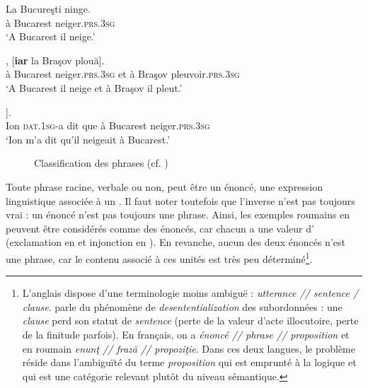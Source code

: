 \ea
\ea
\gll   La  Bucureşti  ninge. \label{ch1:ex21a}\\
à  Bucarest  neiger.\textsc{prs.3sg}\\
\glt ‘A Bucarest il neige.’ 

\ex
{},  [\textbf{iar}  la  Braşov  plouă]. \label{ch1:ex21b}\\
    à  Bucarest  neiger\textsc{.prs.3sg} et  à  Braşov  pleuvoir.\textsc{prs.3sg}\\
\glt ‘A Bucarest il neige et à Braşov il pleut.’ 

\ex
\gll  [Ion  mi-a  spus  [\textbf{că}  la  Bucureşti  ninge]]. \label{ch1:ex21c}\\
    Ion  \textsc{dat.1sg}{}-a  dit  que  à  Bucarest  neiger\textsc{.prs.3sg}\\
\glt ‘Ion m’a dit qu’il neigeait à Bucarest.’ 
\z
\z


\begin{figure} 

\caption{Classification des phrases (cf. \citealt{AbeilleToAppear})}
\label{ch1:fig1}
\end{figure}
   
Toute phrase racine, verbale ou non, peut être un énoncé, {\cad} une expression linguistique associée à un . Il faut noter toutefois que l’inverse n’est pas toujours vrai : un énoncé n’est pas toujours une phrase. Ainsi, les exemples roumains en  peuvent être considérés comme des énoncés, car chacun a une valeur d’ (exclamation en  et injonction en ). En revanche, aucun des deux énoncés n’est une phrase, car le contenu associé à ces unités est très peu déterminé\footnote{L’anglais dispose d’une terminologie moins ambiguë : \textit{utterance // sentence / clause}. \citet{Huddleston1994} parle du phénomène de \textit{desententialization} des subordonnées : une \textit{clause} perd son statut de \textit{sentence} (perte de la valeur d’acte illocutoire, perte de la finitude parfois). En français, on a \textit{énoncé // phrase // proposition} et en roumain \textit{enunţ // frază // propoziţie}. Dans ces deux langues, le problème réside dans l’ambiguïté du terme \textit{proposition} qui est emprunté à la logique et qui est une catégorie relevant plutôt du niveau sémantique.}.

